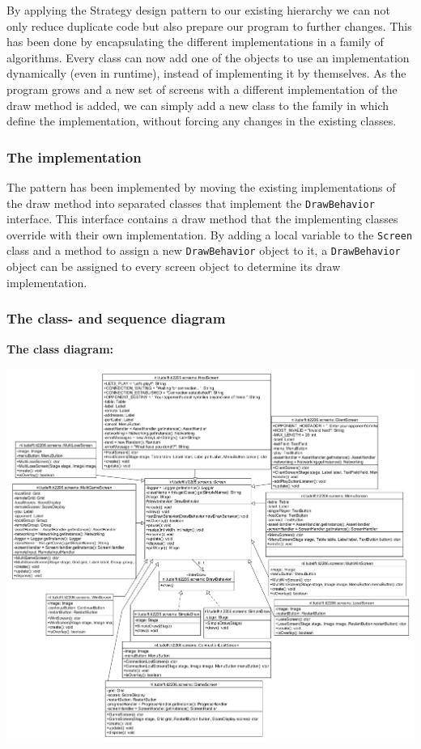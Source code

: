\documentclass[a4paper,11pt,report]{scrartcl}
\begin{document}
By applying the Strategy design pattern to our existing hierarchy we can not
only reduce duplicate code but also prepare our program to further changes.
This has been done by encapsulating the different implementations in a family
of algorithms. Every class can now add one of the objects to use an implementation
dynamically (even in runtime), instead of implementing it by themselves. As
the program grows and a new set of screens with a different implementation
of the draw method is added, we can simply add a new class to the family
in which define the implementation, without forcing any changes in the existing
classes.

\subsubsection{The implementation}
The pattern has been implemented by moving the existing implementations of the
draw method into separated classes that implement the \texttt{DrawBehavior} interface.
This interface contains a draw method that the implementing classes override
with their own implementation. By adding a local variable to the
\texttt{Screen} class and a method to assign a new \texttt{DrawBehavior} object to it, a
\texttt{DrawBehavior} object can be assigned to every screen object to determine its
draw implementation.

\newpage\subsubsection{The class- and sequence diagram}
\textbf{The class diagram:}\\
\centerline{\includegraphics[scale=0.40]{sources/StrategyUML}}
\end{document}
